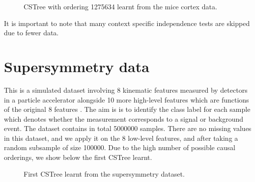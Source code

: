 \documentclass{tufte-book}
\begin{document}
\begin{figure}[!h]\label{fig:mice1}
   \begin{floatrow}
%
\caption{CSTree with ordering 1275634 learnt from the mice cortex data.}
        
   \end{floatrow}
\end{figure}


It is important to note that many context specific independence tests are skipped due to fewer data.



\section{Supersymmetry data}
\label{sec:org0438814}

This is a simulated dataset involving 8 kinematic features measured by detectors in a particle accelerator alongside 10 more high-level features which are functions of the original 8 features \cite{baldi-2014-searc-exotic}. The aim is is to identify the class label for each sample which denotes whether the measurement corresponds to a signal or background event. The dataset contains in total 5000000 samples. There are no missing values in this dataset, and we apply it on the 8 low-level features, and after taking a random subsample of size 100000. Due to the high number of possible causal orderings, we show below the first CSTree learnt.

\begin{figure}[!h]\label{fig:susy1}
   \begin{floatrow}
%
\caption{First CSTree learnt from the supersymmetry dataset.}
        
   \end{floatrow}
\end{figure}
\end{document}
